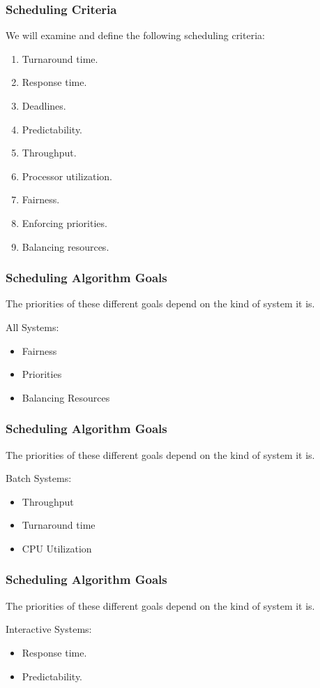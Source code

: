 \begin{frame}
\frametitle{Scheduling Criteria}

We will examine and define the following scheduling criteria:

\begin{enumerate}
	\item Turnaround time.
	\item Response time.
	\item Deadlines.
	\item Predictability.
	\item Throughput.
	\item Processor utilization.
	\item Fairness.
	\item Enforcing priorities.
	\item Balancing resources.
\end{enumerate}


\end{frame}

\begin{frame}
\frametitle{Scheduling Algorithm Goals}

The priorities of these different goals depend on the kind of system it is. 

All Systems:
\begin{itemize}
	\item Fairness
	\item Priorities
	\item Balancing Resources
\end{itemize}

\end{frame}

\begin{frame}
\frametitle{Scheduling Algorithm Goals}

The priorities of these different goals depend on the kind of system it is. 

Batch Systems:
\begin{itemize}
	\item Throughput
	\item Turnaround time
	\item CPU Utilization
\end{itemize}

\end{frame}

\begin{frame}
\frametitle{Scheduling Algorithm Goals}

The priorities of these different goals depend on the kind of system it is. 

Interactive Systems:
\begin{itemize}
	\item Response time.
	\item Predictability.
\end{itemize}

\end{frame}


